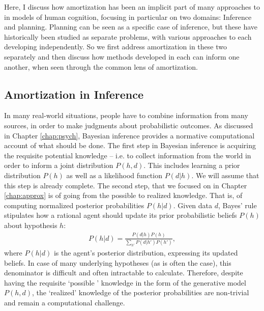 Here, I discuss how amortization has been an implicit part of many approaches to  in models of human cognition, focusing in particular on two domains: Inference and planning. Planning can be seen as a specific case of inference\citep{botvinick2012planning}, but these have historically been studied as separate problems, with various approaches to each developing independently. So we first address amortization in these two separately and then discuss how  methods developed in each can inform one another, when seen through the common lens of amortization.

\subsection{Amortization in Inference}


In many real-world situations, people have to combine information from many sources, in order to make judgments about probabilistic outcomes. As discussed in Chapter \ref{chap:psych}, Bayesian inference provides a normative computational account of what should be done. The first step in Bayesian inference is acquiring the requisite potential knowledge  -- i.e. to collect information from the world in order to inform a joint distribution $P(h,d)$. This includes learning a prior distribution $P(h)$ as well as a likelihood function $P(d | h)$. We will assume that this step is already complete. The second step, that we focused on in Chapter \ref{chap:approx} is of going from the possible to realized knowledge. That is, of computing normalized posterior probabilities  $P(h |d)$. Given data $d$, Bayes' rule stipulates how a rational agent should update its prior probabilistic beliefs $P(h)$ about hypothesis $h$:
\begin{align}
    P(h|d) = \frac{P(d|h)P(h)}{\sum_{h'} P(d|h') P(h')},
\end{align}
where $P(h|d)$ is the agent's posterior distribution, expressing its updated beliefs. In case of many underlying hypotheses (as is often the case), this denominator is difficult and often intractable to calculate. Therefore, despite having the requisite `possible ' knowledge in the form of the generative model $P(h,d)$, the `realized' knowledge of the posterior probabilities are non-trivial and remain a computational challenge.

